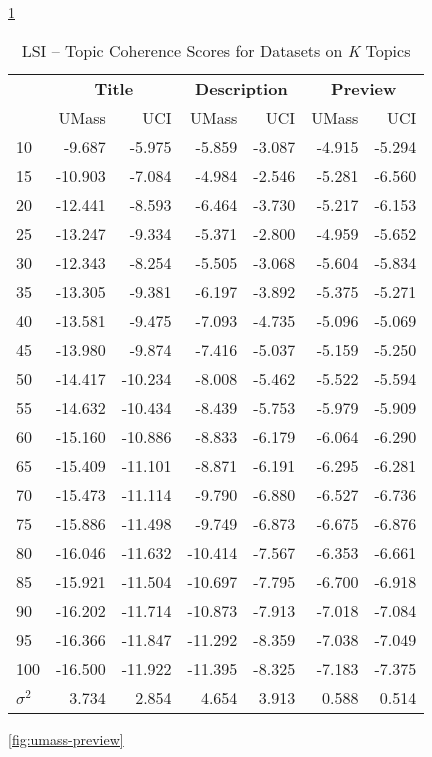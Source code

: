 \documentclass[letterpaper,12pt]{article}
\begin{document}
\ref{tab:lsi_data_comp}
\begin{table}
	\caption{\label{tab:lsi_data_comp} LSI -- Topic Coherence Scores for Datasets on \emph{K} Topics}
	\begin{center}
		\begin{tabular}{| l | rr | rr | rr |}
			\hline
			{} & \multicolumn{2}{c|}{\textbf{Title}} & \multicolumn{2}{c|}{\textbf{Description}} & \multicolumn{2}{c|}{\textbf{Preview}} \\
			{} &       UMass &    UCI &  UMass &    UCI &   UMass &    UCI \\
			\hline
				10  &  -9.687 &  -5.975 &      -5.859 & -3.087 &  -4.915 & -5.294 \\
				15  & -10.903 &  -7.084 &      -4.984 & -2.546 &  -5.281 & -6.560 \\
				20  & -12.441 &  -8.593 &      -6.464 & -3.730 &  -5.217 & -6.153 \\
				25  & -13.247 &  -9.334 &      -5.371 & -2.800 &  -4.959 & -5.652 \\
				30  & -12.343 &  -8.254 &      -5.505 & -3.068 &  -5.604 & -5.834 \\
				35  & -13.305 &  -9.381 &      -6.197 & -3.892 &  -5.375 & -5.271 \\
				40  & -13.581 &  -9.475 &      -7.093 & -4.735 &  -5.096 & -5.069 \\
				45  & -13.980 &  -9.874 &      -7.416 & -5.037 &  -5.159 & -5.250 \\
				50  & -14.417 & -10.234 &      -8.008 & -5.462 &  -5.522 & -5.594 \\
				55  & -14.632 & -10.434 &      -8.439 & -5.753 &  -5.979 & -5.909 \\
				60  & -15.160 & -10.886 &      -8.833 & -6.179 &  -6.064 & -6.290 \\
				65  & -15.409 & -11.101 &      -8.871 & -6.191 &  -6.295 & -6.281 \\
				70  & -15.473 & -11.114 &      -9.790 & -6.880 &  -6.527 & -6.736 \\
				75  & -15.886 & -11.498 &      -9.749 & -6.873 &  -6.675 & -6.876 \\
				80  & -16.046 & -11.632 &     -10.414 & -7.567 &  -6.353 & -6.661 \\
				85  & -15.921 & -11.504 &     -10.697 & -7.795 &  -6.700 & -6.918 \\
				90  & -16.202 & -11.714 &     -10.873 & -7.913 &  -7.018 & -7.084 \\
				95  & -16.366 & -11.847 &     -11.292 & -8.359 &  -7.038 & -7.049 \\
				100 & -16.500 & -11.922 &     -11.395 & -8.325 &  -7.183 & -7.375 \\
			\hline
			$\sigma^2$ & 3.734 & 2.854 & 4.654 & 3.913 & 0.588 & 0.514 \\
			\hline
			\end{tabular}
	\end{center}
\end{table}
\ref{fig:umass-preview}
\end{document}
